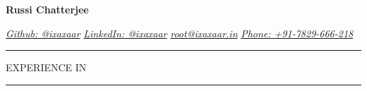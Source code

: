 \documentclass[10pt]{article} %
\begin{document}
\begin{center}
\Huge\textbf{Russi Chatterjee}
\end{center}

\noindent\href{https://github.com/ixaxaar}{\textit{\textcolor{RoyalPurple}{Github: @ixaxaar}}} \hspace{20pt} \href{http://in.linkedin.com/in/ixaxaar/}{\textit{\textcolor{RoyalPurple}{LinkedIn: @ixaxaar}}} \hspace{20pt}
\href{mailto:russichatterjee@gmail.com}{\textit{\textcolor{RoyalPurple}{root@ixaxaar.in}}} \hspace{20pt} \href{tel:917829666218}{\textit{\textcolor{RoyalPurple}{Phone: +91-7829-666-218}}}
\newline
\newline
{}

\noindent\textcolor{Emerald}{\rule{17cm}{1.8pt}}

\newline

\noindent\large{EXPERIENCE IN}

\noindent\textcolor{Emerald}{\rule{17cm}{1.8pt}}
\end{document}

